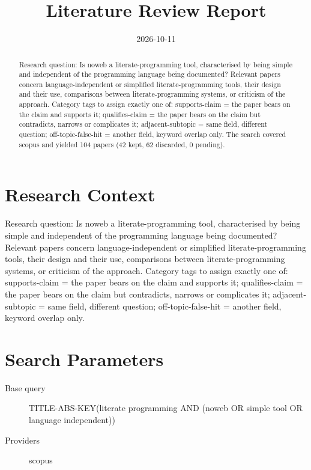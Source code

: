 \documentclass{article}
\title{Literature Review Report}
\date{2026-10-11}
\begin{document}
\maketitle

\begin{abstract}
Research question: Is noweb a literate-programming tool, characterised by being simple and independent of the programming language being documented? Relevant papers concern language-independent or simplified literate-programming tools, their design and their use, comparisons between literate-programming systems, or criticism of the approach. Category tags to assign exactly one of: supports-claim = the paper bears on the claim and supports it; qualifies-claim = the paper bears on the claim but contradicts, narrows or complicates it; adjacent-subtopic = same field, different question; off-topic-false-hit = another field, keyword overlap only. The search covered scopus and yielded 104 papers (42 kept, 62 discarded, 0 pending).
\end{abstract}
\clearpage
\clearpage
\tableofcontents
\clearpage

\section{Research Context}
Research question: Is noweb a literate-programming tool, characterised
by being simple and independent of the programming language being
documented? Relevant papers concern language-independent or simplified
literate-programming tools, their design and their use, comparisons
between literate-programming systems, or criticism of the approach.
Category tags to assign exactly one of: supports-claim = the paper bears
on the claim and supports it; qualifies-claim = the paper bears on the
claim but contradicts, narrows or complicates it; adjacent-subtopic =
same field, different question; off-topic-false-hit = another field,
keyword overlap only.

\section{Search Parameters}

\begin{description}
\item[Base query] TITLE-ABS-KEY(\textquotedbl{}literate programming\textquotedbl{} AND (noweb OR \textquotedbl{}simple tool\textquotedbl{} OR \textquotedbl{}language independent\textquotedbl{}))
\item[Providers] scopus
\end{description}
\end{document}
